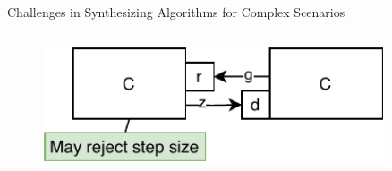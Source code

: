 \documentclass{beamer}
\begin{document}
\begin{frame}{Challenges in Synthesizing Algorithms for Complex Scenarios}
\begin{columns}[T]
    \begin{column}{.48\textwidth}
        \begin{figure}    
            \centering
            \includegraphics[width=0.9\textwidth]{images/step_scenario_org.pdf}
        \end{figure}
    \end{column}
    \end{columns}
\end{frame}
\end{document}
